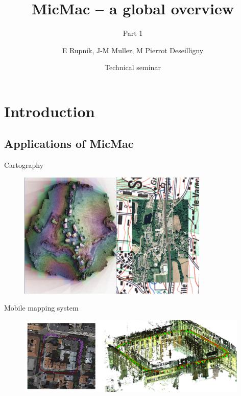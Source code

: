 \documentclass{beamer}
\title{MicMac -- a global overview}
\subtitle{Part 1}
\institute{IGN}
\date[25 May 2018]{Technical seminar}
\author[E Rupnik]{E Rupnik, J-M Muller, M Pierrot Deseilligny}
\begin{document}
    \begin{frame}[plain]
        \titlepage{}
    \end{frame}

	\tableofcontents
	

	
	
      \section{Introduction}  
      	\subsection{Applications of MicMac}
		\begin{frame}{Cartography}
		 
			\begin{figure}
			  \includegraphics[height=6cm]{../MicmacQuickMay2018/images/usage2}
			\end{figure}
		\end{frame}	
		
		\begin{frame}{Mobile mapping system}
			\begin{figure}
			  \includegraphics[width=11cm]{images/trajectory.png}
			\end{figure}
		\end{frame}	
		
\end{document}
